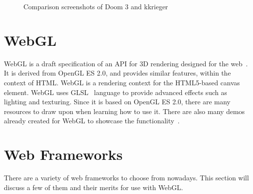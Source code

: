 \documentclass[12pt]{article}
\begin{document}
\begin{figure}
  \centering
  \caption{Comparison screenshots of Doom 3 and kkrieger}
  \label{fig:kkriegerdoomcomp}
\end{figure}

\section{WebGL}
WebGL is a draft specification of an API for 3D rendering designed for the web~\cite{web:webglspec}.
It is derived from OpenGL ES 2.0, and provides similar features, within the context of HTML.
WebGL is a rendering context for the HTML5-based canvas element.
WebGL uses GLSL~\cite{web:glsl} language to provide advanced effects such as lighting and texturing.
Since it is based on OpenGL ES 2.0, there are many resources to draw upon when learning how to use it.
There are also many demos already created for WebGL to showcase the functionality~\cite{web:chromeexperiments}.

\section{Web Frameworks}
There are a variety of web frameworks to choose from nowadays.
This section will discuss a few of them and their merits for use with WebGL.
\end{document}
